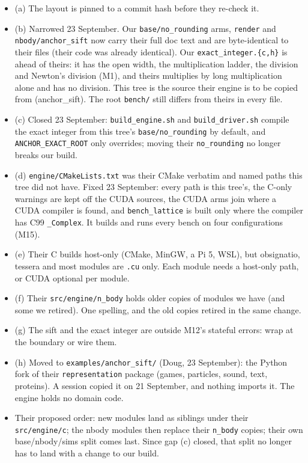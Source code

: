 \begin{enumerate}
\begin{itemize}
\item (a) The layout is pinned to a commit hash before they re-check it.
\item (b) Narrowed 23 September. Our \texttt{base/\allowbreak{}no\_\allowbreak{}rounding} arms, \texttt{render} and \texttt{nbody/\allowbreak{}anchor\_\allowbreak{}sift} now carry their full doc text and are byte-identical to their files (their code was already identical). Our \texttt{exact\_\allowbreak{}integer.\allowbreak{}\{c,h\}} is ahead of theirs: it has the open width, the multiplication ladder, the division and Newton's division (M1), and theirs multiplies by long multiplication alone and has no division. This tree is the source their engine is to be copied from (anchor\_\allowbreak{}sift). The root \texttt{bench/\allowbreak{}} still differs from theirs in every file.
\item (c) Closed 23 September: \texttt{build\_\allowbreak{}engine.\allowbreak{}sh} and \texttt{build\_\allowbreak{}driver.\allowbreak{}sh} compile the exact integer from this tree's \texttt{base/\allowbreak{}no\_\allowbreak{}rounding} by default, and \texttt{ANCHOR\_\allowbreak{}EXACT\_\allowbreak{}ROOT} only overrides; moving their \texttt{no\_\allowbreak{}rounding} no longer breaks our build.
\item (d) \texttt{engine/\allowbreak{}CMake\allowbreak{}Lists.\allowbreak{}txt} was their CMake verbatim and named paths this tree did not have. Fixed 23 September: every path is this tree's, the C-only warnings are kept off the CUDA sources, the CUDA arms join where a CUDA compiler is found, and \texttt{bench\_\allowbreak{}lattice} is built only where the compiler has C99 \texttt{\_\allowbreak{}Complex}. It builds and runs every bench on four configurations (M15).
\item (e) Their C builds host-only (CMake, MinGW, a Pi 5, WSL), but obsignatio, tessera and most modules are \texttt{.\allowbreak{}cu} only. Each module needs a host-only path, or CUDA optional per module.
\item (f) Their \texttt{src/\allowbreak{}engine/\allowbreak{}n\_\allowbreak{}body} holds older copies of modules we have (and some we retired). One spelling, and the old copies retired in the same change.
\item (g) The sift and the exact integer are outside M12's stateful errors: wrap at the boundary or wire them.
\item (h) Moved to \texttt{examples/\allowbreak{}anchor\_\allowbreak{}sift/\allowbreak{}} (Doug, 23 September): the Python fork of their \texttt{representation} package (games, particles, sound, text, proteins). A session copied it on 21 September, and nothing imports it. The engine holds no domain code.
\item Their proposed order: new modules land as siblings under their \texttt{src/\allowbreak{}engine/\allowbreak{}c}; the nbody modules then replace their \texttt{n\_\allowbreak{}body} copies; their own base/nbody/sims split comes last. Since gap (c) closed, that split no longer has to land with a change to our build.
\end{itemize}
\end{enumerate}
